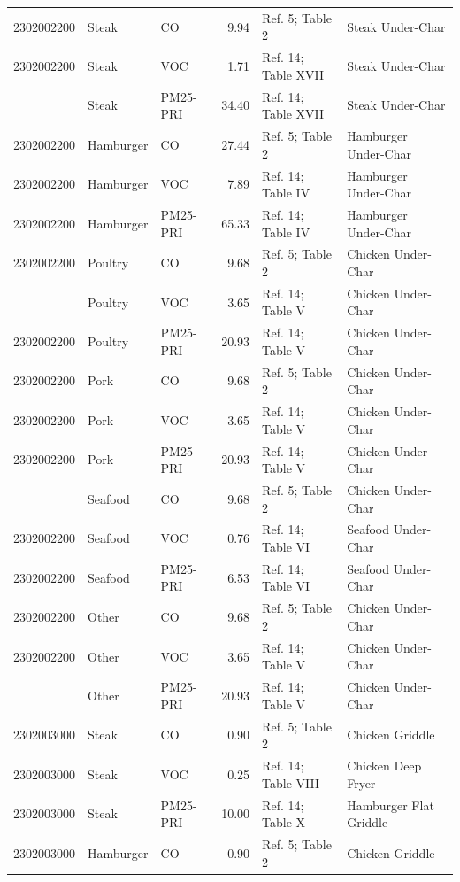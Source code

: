 \documentclass[
  11pt,
  oneside]{book}
\begin{document}
\begin{table}[H]
{\begin{tabular}[t]{rllrll}
2302002200 & Steak & CO & 9.94 & Ref. 5; Table 2 & Steak Under-Char\\
2302002200 & Steak & VOC & 1.71 & Ref. 14; Table XVII & Steak Under-Char\\
\addlinespace
2302002200 & Steak & PM25-PRI & 34.40 & Ref. 14; Table XVII & Steak Under-Char\\
2302002200 & Hamburger & CO & 27.44 & Ref. 5; Table 2 & Hamburger Under-Char\\
2302002200 & Hamburger & VOC & 7.89 & Ref. 14; Table IV & Hamburger Under-Char\\
2302002200 & Hamburger & PM25-PRI & 65.33 & Ref. 14; Table IV & Hamburger Under-Char\\
2302002200 & Poultry & CO & 9.68 & Ref. 5; Table 2 & Chicken Under-Char\\
\addlinespace
2302002200 & Poultry & VOC & 3.65 & Ref. 14; Table V & Chicken Under-Char\\
2302002200 & Poultry & PM25-PRI & 20.93 & Ref. 14; Table V & Chicken Under-Char\\
2302002200 & Pork & CO & 9.68 & Ref. 5; Table 2 & Chicken Under-Char\\
2302002200 & Pork & VOC & 3.65 & Ref. 14; Table V & Chicken Under-Char\\
2302002200 & Pork & PM25-PRI & 20.93 & Ref. 14; Table V & Chicken Under-Char\\
\addlinespace
2302002200 & Seafood & CO & 9.68 & Ref. 5; Table 2 & Chicken Under-Char\\
2302002200 & Seafood & VOC & 0.76 & Ref. 14; Table VI & Seafood Under-Char\\
2302002200 & Seafood & PM25-PRI & 6.53 & Ref. 14; Table VI & Seafood Under-Char\\
2302002200 & Other & CO & 9.68 & Ref. 5; Table 2 & Chicken Under-Char\\
2302002200 & Other & VOC & 3.65 & Ref. 14; Table V & Chicken Under-Char\\
\addlinespace
2302002200 & Other & PM25-PRI & 20.93 & Ref. 14; Table V & Chicken Under-Char\\
2302003000 & Steak & CO & 0.90 & Ref. 5; Table 2 & Chicken Griddle\\
2302003000 & Steak & VOC & 0.25 & Ref. 14; Table VIII & Chicken Deep Fryer\\
2302003000 & Steak & PM25-PRI & 10.00 & Ref. 14; Table X & Hamburger Flat Griddle\\
2302003000 & Hamburger & CO & 0.90 & Ref. 5; Table 2 & Chicken Griddle\\

\end{tabular}}
\end{table}
\end{document}
